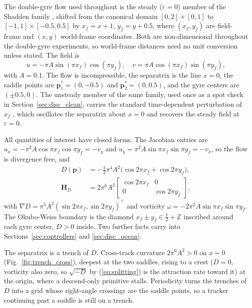 \documentclass[lettersize,journal]{IEEEtran}
\begin{document}
The double-gyre flow used throughout is the steady ($\varepsilon = 0$)
member of the Shadden family \cite{11}, shifted from the canonical domain
$[0,2] \times [0,1]$ to $[-1,1] \times [-0.5, 0.5]$ by
$x_f = x + 1$, $y_f = y + 0.5$, where $(x_f, y_f)$ are field-frame and
$(x, y)$ world-frame coordinates. Both are non-dimensional throughout the
double-gyre experiments, so world-frame distances need no unit
conversion unless stated. The field is
\begin{equation}
    u = -\pi A \sin(\pi x_f) \cos(\pi y_f), \quad
    v = \pi A \cos(\pi x_f) \sin(\pi y_f),
    \label{eq:dg_u}
\end{equation}
with $A = 0.1$. The flow is incompressible, the separatrix is the line
$x = 0$, the saddle points are $\mathbf{p}^*_1 = (0, -0.5)$ and
$\mathbf{p}^*_2 = (0, 0.5)$, and the gyre centers are $(\pm 0.5, 0)$.
The unsteady member of the same family, used once as a spot check in
Section~\ref{sec:disc_clean}, carries the standard time-dependent
perturbation of $x_f$ \cite{11}, which oscillates the separatrix about
$x = 0$ and recovers the steady field at $\varepsilon = 0$.

All quantities of interest have closed forms. The Jacobian entries are
$u_x = -\pi^2 A \cos\pi x_f \cos\pi y_f = -v_y$ and
$u_y = \pi^2 A \sin\pi x_f \sin\pi y_f = -v_x$, so the flow is divergence
free, and
\begin{equation}
    \begin{aligned}
    D(\mathbf{p}) &= -\tfrac{1}{2}\pi^4 A^2
        \bigl(\cos 2\pi x_f + \cos 2\pi y_f\bigr), \\
    \mathbf{H}_D &= 2\pi^6 A^2
        \begin{bmatrix} \cos 2\pi x_f & 0 \\ 0 & \cos 2\pi y_f \end{bmatrix},
    \end{aligned}
    \label{eq:det_analytic_main}
\end{equation}
with $\nabla D = \pi^5 A^2 (\sin 2\pi x_f, \sin 2\pi y_f)^\top$ and
vorticity $\omega = -2\pi^2 A \sin\pi x_f \sin\pi y_f$. The
Okubo-Weiss boundary is the diamond $x_f \pm y_f \in \tfrac{1}{2} +
\mathbb{Z}$ inscribed around each gyre center, $D > 0$ inside. Two
further facts carry into Sections~\ref{sec:controllers} and
\ref{sec:disc_ocean}.

The separatrix is a trench of $D$. Cross-track curvature
$2\pi^6 A^2 > 0$ on $x = 0$ (Fig.~\ref{fig:trench_cross}), deepest at
the two saddles, rising to a crest ($D = 0$, vorticity also zero, so
$\sqrt{-D}$ by (\ref{eq:splitting}) is the attraction rate toward it)
at the origin, where a descend-only primitive stalls. Periodicity
turns the trenches of $D$ into a grid whose right-angle crossings
are the saddle points, so a tracker continuing past a saddle is still
on a trench.
\end{document}
